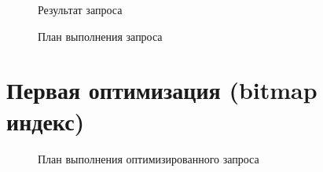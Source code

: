 \begin{figure}[H]%
  \caption{Результат запроса}
  \label{fig-task-3-output}
\end{figure}


\begin{figure}[H]%
  \caption{План выполнения запроса}
  \label{fig-task-3-plan}
\end{figure}


\section{Первая оптимизация (bitmap индекс)}


\begin{figure}[H]%
  \caption{План выполнения оптимизированного запроса}
  \label{fig-task-4-b-tree-plan}
\end{figure}

